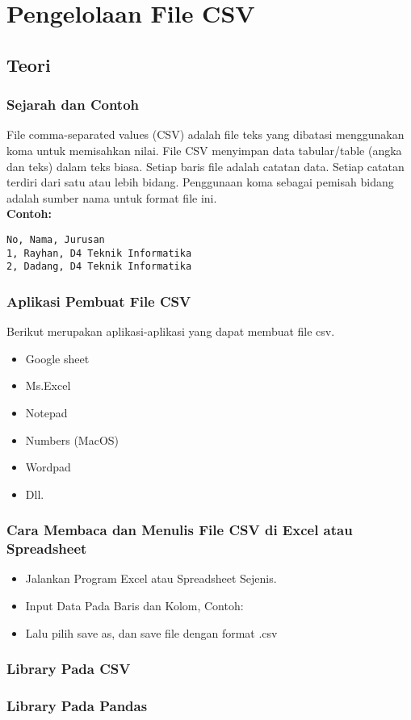 \chapter{Pengelolaan File CSV}
\section{Teori}
\subsection{Sejarah dan Contoh}
File comma-separated values (CSV) adalah file teks yang dibatasi menggunakan koma untuk memisahkan nilai. File CSV menyimpan data tabular/table (angka dan teks) dalam teks biasa. Setiap baris file adalah catatan data. Setiap catatan terdiri dari satu atau lebih bidang. Penggunaan koma sebagai pemisah bidang adalah sumber nama untuk format file ini.\\
\textbf{Contoh:}
\begin{lstlisting}
No, Nama, Jurusan
1, Rayhan, D4 Teknik Informatika
2, Dadang, D4 Teknik Informatika
\end{lstlisting}

\subsection{Aplikasi Pembuat File CSV}
Berikut merupakan aplikasi-aplikasi yang dapat membuat file csv.
\begin{itemize}
\item Google sheet
\item Ms.Excel
\item Notepad
\item Numbers (MacOS)
\item Wordpad
\item Dll.
\end{itemize}

\subsection{Cara Membaca dan Menulis File CSV di Excel atau Spreadsheet}
\begin{itemize}
\item Jalankan Program Excel atau Spreadsheet Sejenis.
\item Input Data Pada Baris dan Kolom, Contoh:
\item Lalu pilih save as, dan save file dengan format .csv
\end{itemize}

\subsection{Library Pada CSV}






\subsection{Library Pada Pandas}

